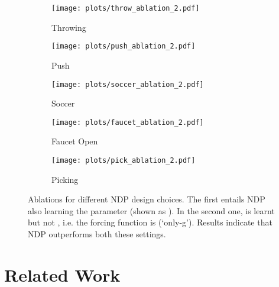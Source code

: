 \documentclass{article}
\newcommand{\our}{NDP\xspace}
\begin{document}
\begin{figure}[h!]
\centering
\begin{subfigure}[b]{0.27\linewidth}
    \texttt{[image: plots/throw\_ablation\_2.pdf]}
    \vspace{-0.26in}
    \caption{\small Throwing}
    \label{fig:throw-ablation-2}
\end{subfigure}
\begin{subfigure}[b]{0.27\linewidth}
    \texttt{[image: plots/push\_ablation\_2.pdf]}
    \vspace{-0.26in}
    \caption{\small Push}
    \label{fig:push-ablation-2}
\end{subfigure}
\begin{subfigure}[b]{0.27\linewidth}
    \texttt{[image: plots/soccer\_ablation\_2.pdf]}
    \vspace{-0.26in}
    \caption{\small Soccer}
    \label{fig:soccer-ablation-2}
\end{subfigure}
\begin{subfigure}[b]{0.27\linewidth}
    \texttt{[image: plots/faucet\_ablation\_2.pdf]}
    \vspace{-0.26in}
    \caption{\small Faucet Open}
    \label{fig:faucet-ablation-2}
\end{subfigure}
\begin{subfigure}[b]{0.27\linewidth}
    \texttt{[image: plots/pick\_ablation\_2.pdf]}
    \vspace{-0.26in}
    \caption{\small Picking}
    \label{fig:pick-ablation-2}
\end{subfigure}
\vspace{-0.01in}
\caption{\small Ablations for different \our design choices. The first entails \our also learning the parameter  (shown as ). In the second one,  is learnt but not , i.e. the forcing function is  (`only-g'). Results indicate that \our outperforms both these settings.}
\vspace{-0.06in}
\label{fig:ablation-2}
\end{figure}

\section{Related Work}
\end{document}
